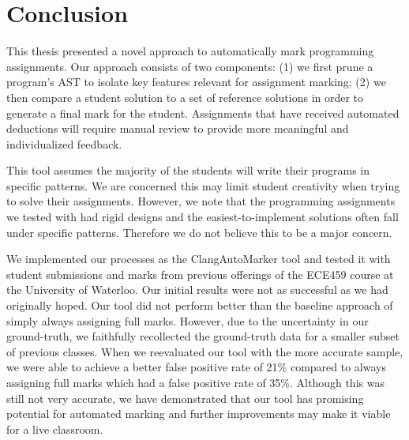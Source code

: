 \chapter{Conclusion}
\label{chap:conclusion}

This thesis presented a novel approach to automatically mark programming assignments. Our approach consists of two components: (1) we first prune a program's AST to isolate key features relevant for assignment marking; (2) we then compare a student solution to a set of reference solutions in order to generate a final mark for the student. Assignments that have received automated deductions will require manual review to provide more meaningful and individualized feedback.

This tool assumes the majority of the students will write their programs in specific patterns. We are concerned this may limit student creativity when trying to solve their assignments. However, we note that the programming assignments we tested with had rigid designs and the easiest-to-implement solutions often fall under specific patterns. Therefore we do not believe this to be a major concern.

We implemented our processes as the ClangAutoMarker tool and tested it with student submissions and marks from previous offerings of the ECE459 course at the University of Waterloo. Our initial results were not as successful as we had originally hoped. Our tool did not perform better than the baseline approach of simply always assigning full marks. However, due to the uncertainty in our ground-truth, we faithfully recollected the ground-truth data for a smaller subset of previous classes. When we reevaluated our tool with the more accurate sample, we were able to achieve a better false positive rate of 21\% compared to always assigning full marks which had a false positive rate of 35\%. Although this was still not very accurate, we have demonstrated that our tool has promising potential for automated marking and further improvements may make it viable for a live classroom.
